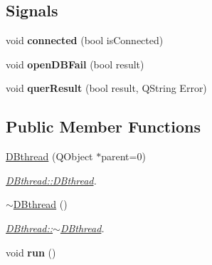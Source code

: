 \subsection*{Signals}
\begin{DoxyCompactItemize}
\item 
\hypertarget{classDBthread_a7b9df87143f9f5d108a8b7ac59c83af0}{void {\bfseries connected} (bool is\-Connected)}\label{classDBthread_a7b9df87143f9f5d108a8b7ac59c83af0}

\item 
\hypertarget{classDBthread_ab7de01fe14f319807df639a50160f107}{void {\bfseries open\-D\-B\-Fail} (bool result)}\label{classDBthread_ab7de01fe14f319807df639a50160f107}

\item 
\hypertarget{classDBthread_ac905b36e66201d6b8bb99de32525a251}{void {\bfseries quer\-Result} (bool result, Q\-String Error)}\label{classDBthread_ac905b36e66201d6b8bb99de32525a251}

\end{DoxyCompactItemize}
\subsection*{Public Member Functions}
\begin{DoxyCompactItemize}
\item 
\hyperlink{classDBthread_aaaf33aa07a311b3fb1711b30de85a0b4}{D\-Bthread} (Q\-Object $\ast$parent=0)
\begin{DoxyCompactList}\small\item\em \hyperlink{classDBthread_aaaf33aa07a311b3fb1711b30de85a0b4}{D\-Bthread\-::\-D\-Bthread}. \end{DoxyCompactList}\item 
\hyperlink{classDBthread_a7efeaae535038f72e32a52f3e69f987c}{$\sim$\-D\-Bthread} ()
\begin{DoxyCompactList}\small\item\em \hyperlink{classDBthread_a7efeaae535038f72e32a52f3e69f987c}{D\-Bthread\-::$\sim$\-D\-Bthread}. \end{DoxyCompactList}\item 
\hypertarget{classDBthread_a63cdd2ec0573009c2d28985a155e7a6a}{void {\bfseries run} ()}\label{classDBthread_a63cdd2ec0573009c2d28985a155e7a6a}

\end{DoxyCompactItemize}


